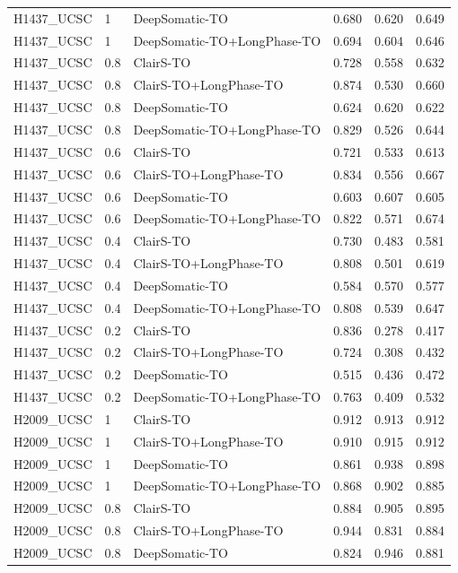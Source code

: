 \documentclass[pdflatex,sn-nature]{sn-jnl}
\begin{document}
{\begin{longtable}{@{}lllccc@{}}
  H1437\_UCSC & 1 & DeepSomatic-TO & 0.680 & 0.620 & 0.649 \\
  H1437\_UCSC & 1 & DeepSomatic-TO+LongPhase-TO & 0.694 & 0.604 & 0.646 \\
  H1437\_UCSC & 0.8 & ClairS-TO & 0.728 & 0.558 & 0.632 \\
  H1437\_UCSC & 0.8 & ClairS-TO+LongPhase-TO & 0.874 & 0.530 & 0.660 \\
  H1437\_UCSC & 0.8 & DeepSomatic-TO & 0.624 & 0.620 & 0.622 \\
  H1437\_UCSC & 0.8 & DeepSomatic-TO+LongPhase-TO & 0.829 & 0.526 & 0.644 \\
  H1437\_UCSC & 0.6 & ClairS-TO & 0.721 & 0.533 & 0.613 \\
  H1437\_UCSC & 0.6 & ClairS-TO+LongPhase-TO & 0.834 & 0.556 & 0.667 \\
  H1437\_UCSC & 0.6 & DeepSomatic-TO & 0.603 & 0.607 & 0.605 \\
  H1437\_UCSC & 0.6 & DeepSomatic-TO+LongPhase-TO & 0.822 & 0.571 & 0.674 \\
  H1437\_UCSC & 0.4 & ClairS-TO & 0.730 & 0.483 & 0.581 \\
  H1437\_UCSC & 0.4 & ClairS-TO+LongPhase-TO & 0.808 & 0.501 & 0.619 \\
  H1437\_UCSC & 0.4 & DeepSomatic-TO & 0.584 & 0.570 & 0.577 \\
  H1437\_UCSC & 0.4 & DeepSomatic-TO+LongPhase-TO & 0.808 & 0.539 & 0.647 \\
  H1437\_UCSC & 0.2 & ClairS-TO & 0.836 & 0.278 & 0.417 \\
  H1437\_UCSC & 0.2 & ClairS-TO+LongPhase-TO & 0.724 & 0.308 & 0.432 \\
  H1437\_UCSC & 0.2 & DeepSomatic-TO & 0.515 & 0.436 & 0.472 \\
  H1437\_UCSC & 0.2 & DeepSomatic-TO+LongPhase-TO & 0.763 & 0.409 & 0.532 \\
  H2009\_UCSC & 1 & ClairS-TO & 0.912 & 0.913 & 0.912 \\
  H2009\_UCSC & 1 & ClairS-TO+LongPhase-TO & 0.910 & 0.915 & 0.912 \\
  H2009\_UCSC & 1 & DeepSomatic-TO & 0.861 & 0.938 & 0.898 \\
  H2009\_UCSC & 1 & DeepSomatic-TO+LongPhase-TO & 0.868 & 0.902 & 0.885 \\
  H2009\_UCSC & 0.8 & ClairS-TO & 0.884 & 0.905 & 0.895 \\
  H2009\_UCSC & 0.8 & ClairS-TO+LongPhase-TO & 0.944 & 0.831 & 0.884 \\
  H2009\_UCSC & 0.8 & DeepSomatic-TO & 0.824 & 0.946 & 0.881 \\

\end{longtable}}
\end{document}
